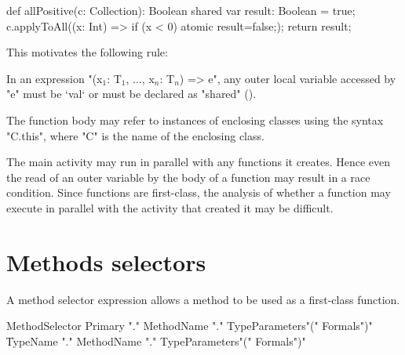 \begin{xten}
def allPositive(c: Collection): Boolean {
  shared var result: Boolean = true;
  c.applyToAll((x: Int) => { if (x < 0) atomic {result=false;}});
  return result;
}
\end{xten}

This motivates the following rule:

\begin{staticrule*}
In an expression
\xcdmath"(x$_1$: T$_1$, $\dots$, x$_n$: T$_n$) => e",
any outer local variable accessed by \xcd"e" must be \xcd`val` or
must be declared
as \xcd"shared" ().
\end{staticrule*}

The function body may refer to instances of enclosing classes using
the syntax \xcd"C.this", where \xcd"C" is the name of the
enclosing class.

\begin{note}
The main activity may run in parallel with any
functions it creates. Hence even the read of an outer variable by the
body of a function may result in a race condition. Since functions are
first-class, the analysis of whether a function may execute in parallel
with the activity that created it may be difficult.
\end{note}


\section{Methods selectors}
\label{MethodSelectors}

A method selector expression allows a method to be used as a
first-class function.

\begin{grammar}
MethodSelector \:
        Primary \xcd"."
        MethodName \xcd"."
                TypeParameters\opt \xcd"(" Formals\opt \xcd")" \\
      \|
        TypeName \xcd"."
        MethodName \xcd"."
                TypeParameters\opt \xcd"(" Formals\opt \xcd")" \\
\end{grammar}

